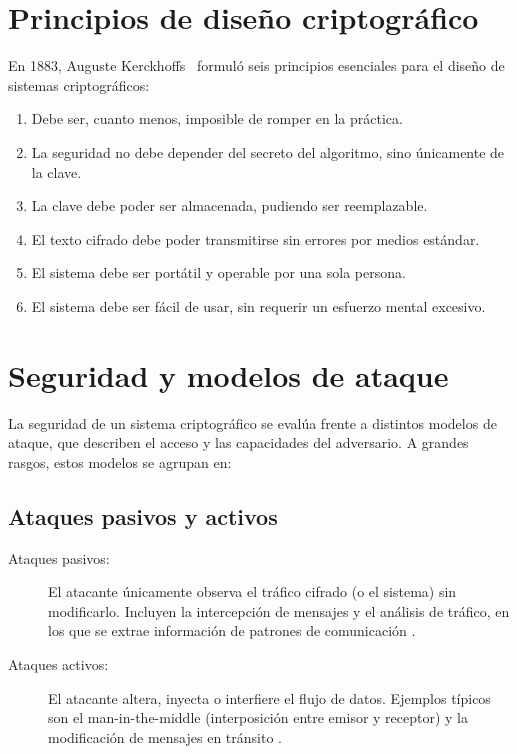 \section{Principios de diseño criptográfico}

En 1883, Auguste Kerckhoffs~\cite{Petitcolas2011Kerckhoffs} formuló seis principios esenciales para el diseño de sistemas criptográficos:

\begin{enumerate}
  \item Debe ser, cuanto menos, imposible de romper en la práctica.
  \item La seguridad no debe depender del secreto del algoritmo, sino únicamente de la clave.
  \item La clave debe poder ser almacenada, pudiendo ser reemplazable.
  \item El texto cifrado debe poder transmitirse sin errores por medios estándar.
  \item El sistema debe ser portátil y operable por una sola persona.
  \item El sistema debe ser fácil de usar, sin requerir un esfuerzo mental excesivo.
\end{enumerate}
\section{Seguridad y modelos de ataque}

La seguridad de un sistema criptográfico se evalúa frente a distintos modelos de ataque, que describen el acceso y las capacidades del adversario. A grandes rasgos, estos modelos se agrupan en:

\subsection{Ataques pasivos y activos}

\begin{description}
  \item[Ataques pasivos:] El atacante únicamente observa el tráfico cifrado (o el sistema) sin modificarlo. Incluyen la intercepción de mensajes y el análisis de tráfico, en los que se extrae información de patrones de comunicación \cite{different_types_cryptography_attacks}\cite{active_and_passive_attacks_in_information_security}.
  \item[Ataques activos:] El atacante altera, inyecta o interfiere el flujo de datos. Ejemplos típicos son el man-in-the-middle (interposición entre emisor y receptor) y la modificación de mensajes en tránsito \cite{what_are_cryptographic_attacks}.
\end{description}

